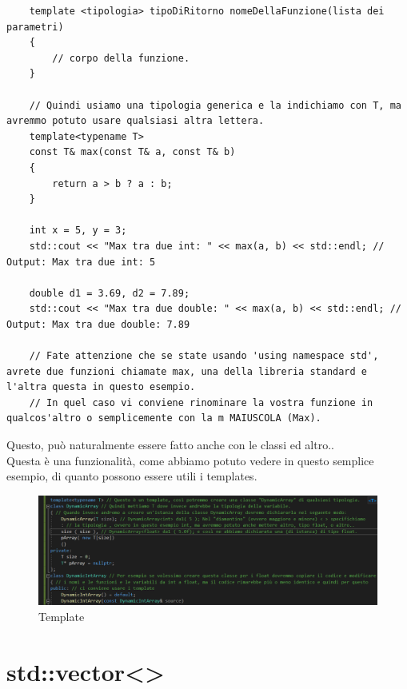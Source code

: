 \textsf{\small }

\begin{lstlisting}
	template <tipologia> tipoDiRitorno nomeDellaFunzione(lista dei parametri)
	{
		// corpo della funzione.
	}

	// Quindi usiamo una tipologia generica e la indichiamo con T, ma avremmo potuto usare qualsiasi altra lettera.
	template<typename T>
	const T& max(const T& a, const T& b)
	{
		return a > b ? a : b;
	}

	int x = 5, y = 3;
	std::cout << "Max tra due int: " << max(a, b) << std::endl; // Output: Max tra due int: 5
	
	double d1 = 3.69, d2 = 7.89;
	std::cout << "Max tra due double: " << max(a, b) << std::endl; // Output: Max tra due double: 7.89
	
	// Fate attenzione che se state usando 'using namespace std', avrete due funzioni chiamate max, una della libreria standard e l'altra questa in questo esempio.
	// In quel caso vi conviene rinominare la vostra funzione in qualcos'altro o semplicemente con la m MAIUSCOLA (Max).
\end{lstlisting}

\textsf{\small Questo, può naturalmente essere fatto anche con le classi ed altro..} \\

\textsf{\small Questa è una funzionalità, come abbiamo potuto vedere in questo semplice esempio, di quanto possono essere utili i templates.} \\

\begin{figure}[ht]
	\centering
	\includegraphics[width=1.2\textwidth, height=1.2\textheight, keepaspectratio]{./imgs/template.png}
	\caption{Template}
	\label{fig:template}
\end{figure}



\section{std::vector<>}

